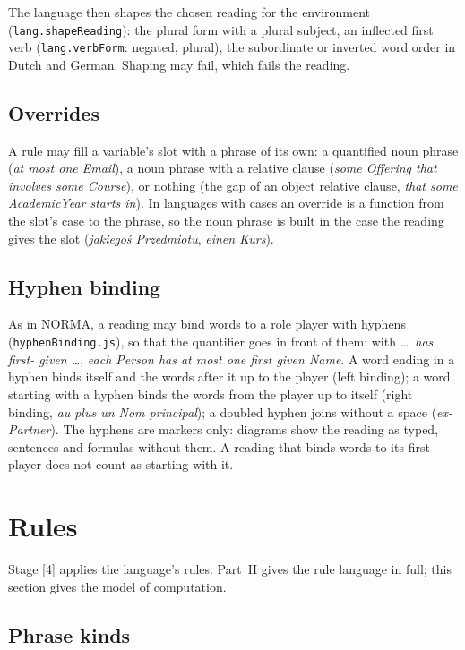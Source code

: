 \documentclass[11pt, a4paper]{article}
\newcommand{\code}[1]{\texttt{\color{codefg}#1}}
\begin{document}
The language then shapes the chosen reading for the environment
(\code{lang.shapeReading}): the plural form with a plural subject, an
inflected first verb (\code{lang.verbForm}: negated, plural), the
subordinate or inverted word order in Dutch and German. Shaping may fail,
which fails the reading.

\subsection{Overrides}

A rule may fill a variable's slot with a phrase of its own: a quantified
noun phrase (\textit{at most one Email}), a noun phrase with a relative
clause (\textit{some Offering that involves some Course}), or nothing (the
gap of an object relative clause, \textit{that some AcademicYear starts
in}). In languages with cases an override is a function from the slot's
case to the phrase, so the noun phrase is built in the case the reading
gives the slot (\textit{jakiegoś Przedmiotu}, \textit{einen Kurs}).

\subsection{Hyphen binding}

As in NORMA, a reading may bind words to a role player with hyphens
(\code{hyphenBinding.js}), so that the quantifier goes in front of them:
with \textit{\ldots\ has first- given \ldots}, \textit{each Person has at
most one first given Name}. A word ending in a hyphen binds itself and the
words after it up to the player (left binding); a word starting with a hyphen
binds the words from the player up to itself (right binding,
\textit{au plus un Nom principal}); a doubled hyphen joins without a space
(\textit{ex-Partner}). The hyphens are markers only: diagrams show the
reading as typed, sentences and formulas without them. A reading that binds
words to its first player does not count as starting with it.

\section{Rules}
\label{sec:rules}

Stage [4] applies the language's rules. Part~II gives the rule language in
full; this section gives the model of computation.

\subsection{Phrase kinds}
\end{document}
